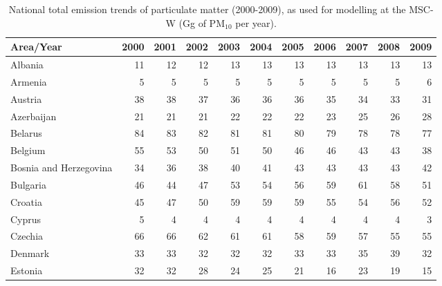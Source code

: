  
 \begin{table}
 \caption{National total emission trends of particulate matter (2000-2009), as used for modelling at the MSC-W (Gg of PM$_{10}$ per year).}
 
 \vspace{15pt}
 
 \scriptsize
 \centering
 \begin{tabular}{|l|r|r|r|r|r|r|r|r|r|r|}
 \hline
                     Area/Year&   2000&   2001&   2002&   2003&   2004&   2005&   2006&   2007&   2008&   2009\\\hline\hline
                       Albania&     11&     12&     12&     13&     13&     13&     13&     13&     13&     13\\\hline
                       Armenia&      5&      5&      5&      5&      5&      5&      5&      5&      5&      6\\\hline
                       Austria&     38&     38&     37&     36&     36&     36&     35&     34&     33&     31\\\hline
                    Azerbaijan&     21&     21&     21&     22&     22&     22&     23&     25&     26&     28\\\hline
                       Belarus&     84&     83&     82&     81&     81&     80&     79&     78&     78&     77\\\hline
                       Belgium&     55&     53&     50&     51&     50&     46&     46&     43&     43&     38\\\hline
        Bosnia and Herzegovina&     34&     36&     38&     40&     41&     43&     43&     43&     43&     42\\\hline
                      Bulgaria&     46&     44&     47&     53&     54&     56&     59&     61&     58&     51\\\hline
                       Croatia&     45&     47&     50&     59&     59&     59&     55&     54&     56&     52\\\hline
                        Cyprus&      5&      4&      4&      4&      4&      4&      4&      4&      4&      3\\\hline
                       Czechia&     66&     66&     62&     61&     61&     58&     59&     57&     55&     55\\\hline
                       Denmark&     33&     33&     32&     32&     32&     33&     33&     35&     39&     32\\\hline
                       Estonia&     32&     32&     28&     24&     25&     21&     16&     23&     19&     15\\\hline

\end{tabular}
\end{table}
